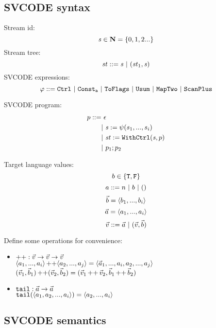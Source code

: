 \subsection{SVCODE syntax}
Stream id: $$\mathit{s} \in \mathbf{N} = \{0,1,2...\}$$
Stream tree: $$ \mathit{st} ::= \mathit{s} \ | \ (\mathit{st}_1,\mathit{s}) $$
SVCODE expressions: $$\varphi ::= \mathtt{Ctrl} \ | \ \mathtt{Const_{a}} \ | \ \mathtt{ToFlags}
\ | \ \mathtt{Usum} \ | \ \mathtt{MapTwo} \ | \ \mathtt{ScanPlus} $$

SVCODE program: 
\begin{align*}
	p ::= & \ \epsilon \\
	     &| \ \mathit{s} := \psi(s_1,...,s_i) \\
	     &| \ \mathit{st} := \mathtt{WithCtrl}(\mathit{s},p) \\
	     &| \ p_1;p_2 	 
\end{align*}

Target language values: 
$$b \in \{\mathtt{T},\mathtt{F} \}$$
$$a ::= n \ | \ b \ | \ \unit$$
$$\vec b = \langle b_1,...,b_i \rangle$$ 
$$\vec a = \langle a_1,...,a_i \rangle  $$
$$\v ::= \a \ | \ (\v,\b) $$

Define some operations for convenience:
\begin{itemize}
	\item $\operatorname{++}: \vec v \rightarrow  \vec v \rightarrow \vec v$ \\
	  $\langle a_1,...,a_i \rangle \operatorname{++} \langle a_2,...,a_j \rangle = \langle \vec a_1,...,a_i,a_2,...,a_j \rangle $ \\
	  $(\vec v_1,\vec b_1) \operatorname{++} (\vec v_2,\vec b_2) = (\vec v_1 \operatorname{++} \vec v_2, \vec b_1 \operatorname{++} \vec b_2)$
	\item $\texttt{tail}: \vec a \rightarrow \vec a$ \\
	      $\mathtt{tail}(\langle a_1, a_2,...,a_i \rangle) = \langle a_2,...,a_i \rangle$
\end{itemize}


\subsection{SVCODE semantics}



